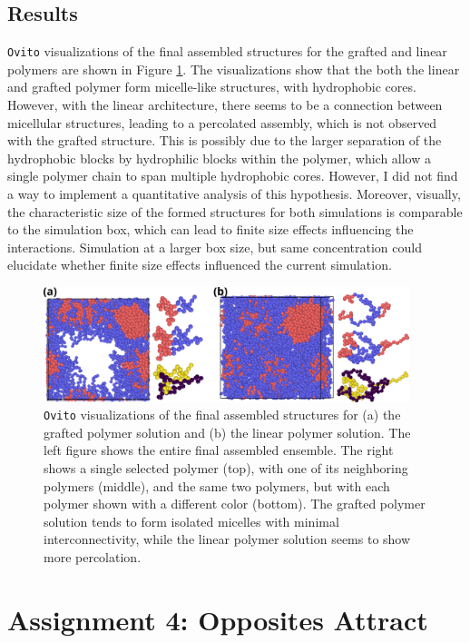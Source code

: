 \documentclass[10pt,a4paper]{labreport}
\begin{document}
\subsection{Results}
\texttt{Ovito} visualizations of the final assembled structures for the grafted and linear polymers are shown in Figure \ref{fig:ass3_assembled}.
The visualizations show that the both the linear and grafted polymer form micelle-like structures, with hydrophobic cores. However, with the linear architecture, there seems to be a connection between micellular structures, leading to a percolated assembly, which is not observed with the grafted structure. This is possibly due to the larger separation of the hydrophobic blocks by hydrophilic blocks within the polymer, which allow a single polymer chain to span multiple hydrophobic cores. However, I did not find a way to implement a quantitative analysis of this hypothesis. Moreover, visually, the characteristic size of the formed structures for both simulations is comparable to the simulation box, which can lead to finite size effects influencing the interactions. Simulation at a larger box size, but same concentration could elucidate whether finite size effects influenced the current simulation. 
\begin{figure}[h]
  \centering  
  \includegraphics[width = 0.95\textwidth]{figs/ass3_assembled.png}
  \caption{\texttt{Ovito} visualizations of the final assembled structures for (a) the grafted polymer solution and (b) the linear polymer solution.  The left figure shows  the entire final assembled ensemble. The right shows a single selected polymer (top), with one of its neighboring polymers (middle), and the same two polymers, but with each polymer shown with a different color (bottom). The grafted polymer solution tends to form isolated micelles with minimal interconnectivity, while the linear polymer solution seems to show more percolation.}
  \label{fig:ass3_assembled}
\end{figure}

\newpage
\section{Assignment 4: Opposites Attract}
\end{document}
